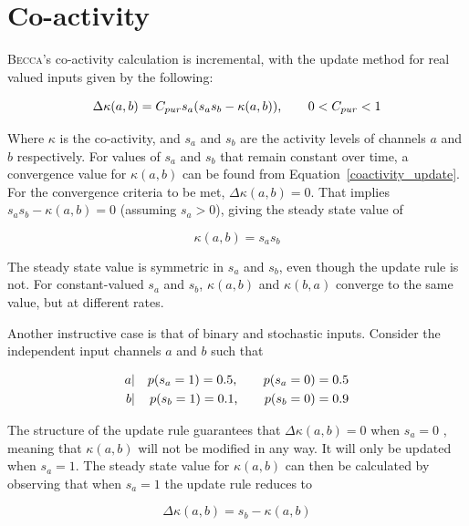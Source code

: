 \section{Co-activity}
\label{coactivity_calc}
\textsc{Becca}'s co-activity calculation is incremental, with the update method for real valued inputs given by the following:

\begin{equation}
\Delta\kappa(a, b) = C_{pur} s_a ( s_a s_b - \kappa(a, b) ) \mbox{,  \hspace{0.2in}  } 0 < C_{pur} < 1		
\label{coactivity_update}
\end{equation}

Where $\kappa$ is the co-activity, and $s_a$ and $s_b$ are the activity levels of channels $a$ and $b$ respectively. For values of $s_a$ and $s_b$ that remain constant over time, a convergence value for $\kappa(a, b)$ can be found from Equation~\ref{coactivity_update}. For the convergence criteria to be met, $\Delta\kappa(a, b) = 0$. That implies $s_a s_b - \kappa(a, b) = 0$ (assuming $s_a > 0$), giving the steady state value of

\begin{equation}
\kappa(a, b) = s_a s_b 
\end{equation}

The steady state value is symmetric in $s_a$ and $s_b$, even though the update rule is not. For constant-valued $s_a$ and $s_b$, $\kappa(a, b)$ and $\kappa(b, a)$ converge to the same value, but at different rates. 

Another instructive case is that of binary and stochastic inputs. Consider the independent input channels $a$ and $b$ such that

\begin{eqnarray}
a &|& p(s_a = 1) = 0.5 \mbox{, \hspace{0.2in}  } p(s_a = 0) = 0.5\\
b &|& p(s_b = 1) = 0.1 \mbox{, \hspace{0.2in}  } p(s_b = 0) = 0.9 	
\end{eqnarray}

The structure of the update rule guarantees that $\Delta\kappa(a, b) = 0$ when $s_a = 0$ , meaning that $\kappa(a, b)$ will not be modified in any way. It will only be updated when $s_a = 1$. The steady state value for $\kappa(a, b)$ can then be calculated by observing that when $s_a = 1$ the update rule reduces to 

\begin{equation}
\Delta \kappa(a, b) = s_b - \kappa(a, b)  
\end{equation}

